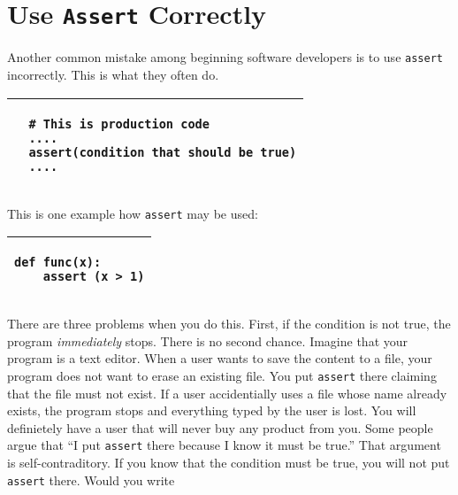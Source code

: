 \section{Use {\tt Assert} Correctly}

Another common mistake among beginning software developers is to use
{\tt assert} incorrectly. This is what they often do.


\vspace{0.2in}

\noindent
\begin{tabular}{|p{5in}|}\hline
\begin{verbatim}
  # This is production code
  ....
  assert(condition that should be true)
  ....
\end{verbatim}
\\ \hline
\end{tabular}
\vspace{0.2in}

This is one example how {\tt assert} may be used:

\vspace{0.2in}

\noindent
\begin{tabular}{|p{5in}|}\hline
\begin{verbatim}
def func(x):
    assert (x > 1)
\end{verbatim}
\\ \hline
\end{tabular}
\vspace{0.2in}

There are three problems when you do this.  First, if the condition is
not true, the program {\it immediately} stops.  There is no second
chance.  Imagine that your program is a text editor. When a user wants
to save the content to a file, your program does not want to erase an
existing file.  You put {\tt assert} there claiming that the file must
not exist. If a user accidentially uses a file whose name already
exists, the program stops and everything typed by the user is lost.
You will definietely have a user that will never buy any product from
you.  Some people argue that ``I put {\tt assert} there because I know
it must be true.'' That argument is self-contraditory.  If you know
that the condition must be true, you will not put {\tt assert} there.
Would you write

